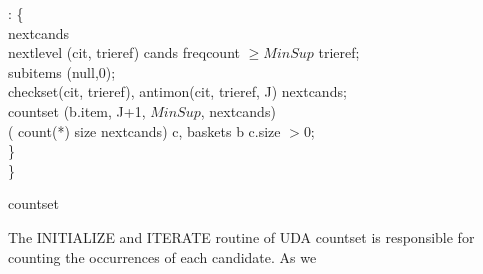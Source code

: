 {{\begin{algorithm}[!htb]
\begin{algorithmic}[1]
\STATE\hspace{.2cm}: \{\hspace{.5cm}\\
\hspace{.6cm}
\STATE{}\hspace{.6cm}  nextcands\\
\hspace{.9cm} nextlevel (cit, trieref)  cands  freqcount $\ge MinSup$  trieref;\\
\hspace{.6cm}
\STATE{}\hspace{.6cm}  subitems (null,0);\\
\STATE\hspace{.6cm} checkset(cit, trieref), antimon(cit, trieref, J)  nextcands; \\
\hspace{.6cm}
\STATE{}\hspace{.6cm} countset (b.item, J+1, $MinSup$, nextcands) \\
\hspace{.9cm} ( count(*)  size  nextcands)  c, baskets  b  c.size $>$0;\\
\hspace{.3cm}\}\\
\STATE\}
\end{algorithmic}
\caption{countset}
\label{alg:countset}
\end{algorithm}
The {\cw INITIALIZE} and {\cw ITERATE} routine of UDA {\bw countset}
is responsible for counting the occurrences of each candidate. As we
}}
